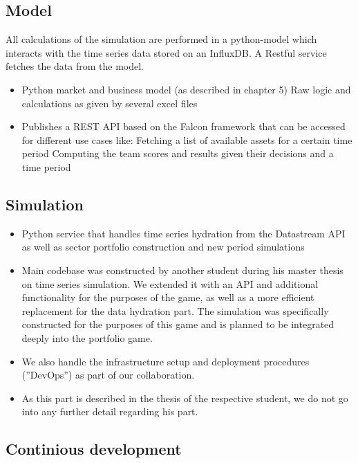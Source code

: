 \subsection{Model}
All calculations of the simulation are performed in a python-model which interacts with the time series data stored on an InfluxDB. A Restful service fetches the data from the model.

\begin{itemize}
  \item Python market and business model (as described in chapter 5)
  \subitem Raw logic and calculations as given by several excel files
  \item Publishes a REST API based on the Falcon framework that can be accessed for different use cases like:
  \subitem Fetching a list of available assets for a certain time period
  \subitem Computing the team scores and results given their decisions and a time period
\end{itemize}

\subsection{Simulation}
\begin{itemize}
  \item Python service that handles time series hydration from the Datastream API as well as sector portfolio construction and new period simulations
  \item Main codebase was constructed by another student during his master thesis on time series simulation. We extended it with an API and additional functionality for the purposes of the game, as well as a more efficient replacement for the data hydration part. The simulation was specifically constructed for the purposes of this game and is planned to be integrated deeply into the portfolio game.
  \item We also handle the infrastructure setup and deployment procedures (''DevOps'') as part of our collaboration.
  \item As this part is described in the thesis of the respective student, we do not go into any further detail regarding his part.
\end{itemize}

\subsection{Continious development}
